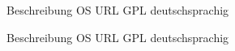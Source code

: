 \documentclass[11pt,a4paper,landscape,twocolumn]{article}
\begin{document}


{Beschreibung}
{OS}
{URL}
{GPL}
{deutschsprachig}


\newpage %


{Beschreibung}
{OS}
{URL}
{GPL}
{deutschsprachig}
\end{document}
